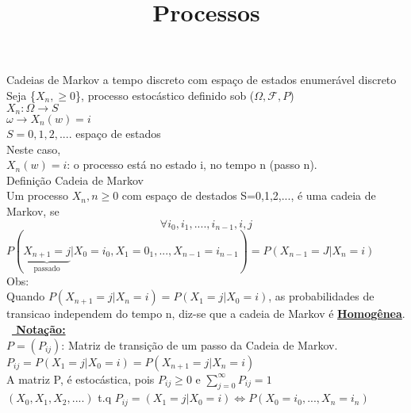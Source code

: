 \documentclass[a4paper,12pt]{article}
\author{}
\begin{document}
\title{Processos}	
\date{}
\maketitle


Cadeias de Markov a tempo discreto com espa\c{c}o de estados enumer\'avel discreto\\
Seja \{$X_n,\ge0$\}, processo estoc\'astico definido sob ($\Omega,\mathscr{F},P$) \\
 $X_n:\Omega\longrightarrow S$\\
 $\omega \longrightarrow X_n(w)=i$\\
 $S={0,1,2,....}$ espa\c{c}o de estados\\
 Neste caso,\\
 $X_n(w)=i$: o processo est\'a no estado i, no tempo n (passo n).\\
 Defini\c{c}\~ao Cadeia de Markov\\
 Um processo {$X_n,n\ge0$} com espa\c{c}o de destados S={0,1,2,...}, \'e uma cadeia de Markov, se\\
 $$\forall i_0,i_1,....,i_{n-1},i,j$$
 $P(\underbrace{X_{n+1}=j}_\text{passado}|X_0=i_0,X_1=0_1,...,X_{n-1}=i_{n-1})=P(X_{n-1}=J|X_n=i)$\\
 Obs:\\
 Quando $P(X_{n+1}=j|X_n=i)=P(X_1=j|X_0=i) $, as probabilidades de transicao independem do tempo n, diz-se que a cadeia de Markov \'e \textbf{\underline{Homog\^enea}}.\\
 \
\textbf{\underline{ Nota\c{c}\~ao:}}\\
 $P=(P_{ij})$: Matriz de transi\c{c}\~ao de um passo da Cadeia de Markov.\\
$P_{ij} =P(X_1=j|X_0=i) =P(X_{n+1}=j|X_n=i)$\\
A matriz P, \'e estoc\'astica, pois $P_{ij}\ge0$ e $\mathop\sum_{j=0}^{\infty} P_{ij}=1$\\
$ (X_0,X_1,X_2,....) $ t.q $ P_{ij}=(X_1=j|X_0=i) \iff P(X_0=i_0,...,X_n=i_n)$\\
\end{document}

